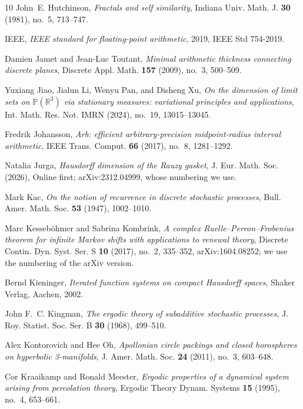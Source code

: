 \documentclass[11pt]{amsart}
\theoremstyle{definition}
\theoremstyle{remark}
\begin{document}
\begin{thebibliography}{10}
John~E. Hutchinson, \emph{Fractals and self similarity}, Indiana Univ. Math. J.
  \textbf{30} (1981), no.~5, 713--747.

{IEEE}, \emph{{IEEE} standard for floating-point arithmetic}, 2019, IEEE Std
  754-2019.

Damien Jamet and Jean-Luc Toutant, \emph{Minimal arithmetic thickness
  connecting discrete planes}, Discrete Appl. Math. \textbf{157} (2009), no.~3,
  500--509.

Yuxiang Jiao, Jialun Li, Wenyu Pan, and Disheng Xu, \emph{On the dimension of
  limit sets on {$\mathbb P(\mathbb R^3)$} via stationary measures: variational
  principles and applications}, Int. Math. Res. Not. IMRN (2024), no.~19,
  13015--13045.

Fredrik Johansson, \emph{Arb: efficient arbitrary-precision midpoint-radius
  interval arithmetic}, IEEE Trans. Comput. \textbf{66} (2017), no.~8,
  1281--1292.

Natalia Jurga, \emph{Hausdorff dimension of the {R}auzy gasket}, J. Eur. Math.
  Soc. (2026), Online first; arXiv:2312.04999, whose numbering we use.

Mark Kac, \emph{On the notion of recurrence in discrete stochastic processes},
  Bull. Amer. Math. Soc. \textbf{53} (1947), 1002--1010.

Marc Kesseb{\"o}hmer and Sabrina Kombrink, \emph{A complex
  {R}uelle--{P}erron--{F}robenius theorem for infinite {M}arkov shifts with
  applications to renewal theory}, Discrete Contin. Dyn. Syst. Ser. S
  \textbf{10} (2017), no.~2, 335--352, arXiv:1604.08252; we use the numbering
  of the arXiv version.

Bernd Kieninger, \emph{Iterated function systems on compact {H}ausdorff
  spaces}, Shaker Verlag, Aachen, 2002.

John F.~C. Kingman, \emph{The ergodic theory of subadditive stochastic
  processes}, J. Roy. Statist. Soc. Ser. B \textbf{30} (1968), 499--510.

Alex Kontorovich and Hee Oh, \emph{Apollonian circle packings and closed
  horospheres on hyperbolic 3-manifolds}, J. Amer. Math. Soc. \textbf{24}
  (2011), no.~3, 603--648.

Cor Kraaikamp and Ronald Meester, \emph{Ergodic properties of a dynamical
  system arising from percolation theory}, Ergodic Theory Dynam. Systems
  \textbf{15} (1995), no.~4, 653--661.


\end{thebibliography}
\end{document}
